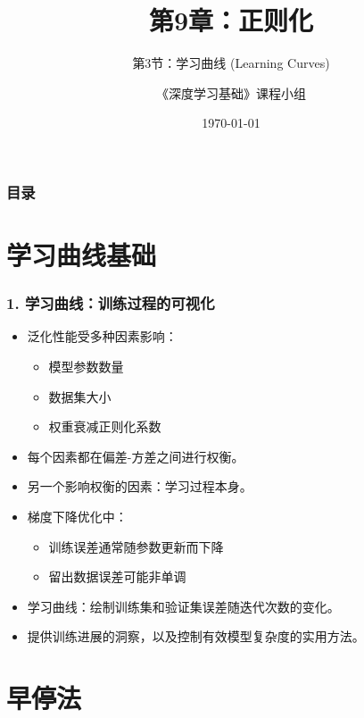 \documentclass[t,aspectratio=169]{beamer} %
\title[9.3.学习曲线]{第9章：正则化}
\subtitle{第3节：学习曲线 (Learning Curves)}
\author{《深度学习基础》课程小组}
\date{\today}
\begin{document}
\frame{\titlepage}

\begin{frame}
    \frametitle{目录}
    \tableofcontents
\end{frame}

\section{学习曲线基础}

\begin{frame}
    \frametitle{1. 学习曲线：训练过程的可视化}
    \begin{itemize}
        \item 泛化性能受多种因素影响：
        \begin{itemize}
            \item 模型参数数量
            \item 数据集大小
            \item 权重衰减正则化系数
        \end{itemize}
        \item 每个因素都在\alert{偏差-方差}之间进行权衡。
        \item 另一个影响权衡的因素：\alert{学习过程本身}。
        \item 梯度下降优化中：
        \begin{itemize}
            \item 训练误差通常随参数更新而\alert{下降}
            \item 留出数据误差可能\alert{非单调}
        \end{itemize}
        \item \alert{学习曲线}：绘制训练集和验证集误差随迭代次数的变化。
        \item 提供训练进展的洞察，以及控制有效模型复杂度的实用方法。
    \end{itemize}
\end{frame}

\section{早停法}
\end{document}
